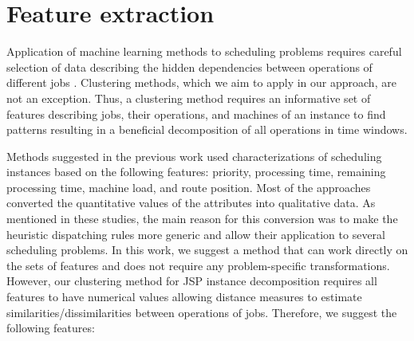 \documentclass[runningheads]{llncs}
\begin{document}
\section{Feature extraction}
\label{sec:features}
Application of machine learning methods to scheduling problems requires careful selection of data describing the hidden dependencies between operations of different jobs \cite{ismail2012production,nasiri2019data}. Clustering methods, which we aim to apply in our approach, are not an exception. Thus, a clustering method requires an informative set of features describing jobs, their operations, and machines of an instance to find patterns resulting in a beneficial decomposition of all operations in time windows. 

Methods suggested in the previous work \cite{koonce2000using, harrath2002genetic, shahzad2010discovering, ismail2012production, adibi2014clustering, nasiri2019data} used characterizations of scheduling instances based on the following features: priority, processing time, remaining processing time, machine load, and route position. 
Most of the approaches converted the quantitative values of the attributes into qualitative data. As mentioned in these studies, the main reason for this conversion was to make the heuristic dispatching rules more generic and allow their application to several scheduling problems. 
In this work, we suggest a method that can work directly on the sets of features and does not require any problem-specific transformations. However, our clustering method for JSP instance decomposition requires all features to have numerical values allowing distance measures to estimate similarities/dissimilarities between operations of jobs.
%
Therefore, we suggest the following features:
\end{document}
